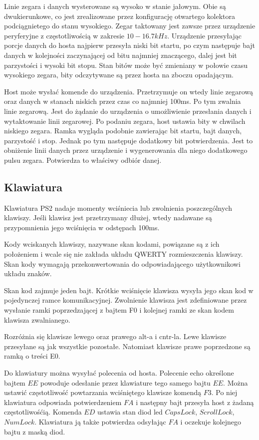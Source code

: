 \documentclass[a4paper,12pt]{article}
\begin{document}
Linie zegara i danych wysterowane są wysoko w stanie jałowym. Obie są dwukierunkowe, co jest zrealizowane przez konfigurację otwartego kolektora podciągnietego do stanu wysokiego. Zegar taktowany jest zawsze przez urządzenie peryferyjne z częstotliwością w zakresie $10 - 16.7 kHz$. Urządzenie przesyłając porcje danych do hosta najpierw przesyła niski bit startu, po czym następuje bajt danych w kolejności zaczynającej od bitu najmniej znaczącego, dalej jest bit parzystości i wysoki bit stopu. Stan bitów może być zmieniany w połowie czasu wysokiego zegara, bity odczytywane są przez hosta na zboczu opadającym.

Host może wysłać komende do urządzenia. Przetrzymuje on wtedy linie zegarową oraz danych w stanach niskich przez czas co najmniej 100ms. Po tym zwalnia linie zegarową. Jest do żądanie do urządzenia o umożliwienie przesłania danych i wytaktowanie linii zegarowej. Po podaniu zegara, host ustawia bity w chwilach niskiego zegara. Ramka wygląda podobnie zawierając bit startu, bajt danych, parzystość i stop. Jednak po tym następuje dodatkowy bit potwierdzenia. Jest to obniżenie linii danych przez urządzenie i wygenerowania dla niego dodatkowego pulsu zegara. Potwierdza to właściwy odbiór danej.

\subsection{Klawiatura}

Klawiatura PS2 nadaje momenty wciśniecia lub zwolnienia poszczególnych klawiszy. Jeśli klawisz jest przetrzymany dłużej, wtedy nadawane są przypomnienia jego wciśnięcia w odstępach 100ms.

Kody wciskanych klawiszy, nazywane skan kodami, powiązane są z ich położeniem i wcale się nie zakłada układu QWERTY rozmieszczenia klawiszy. Skan kody wymagają przekonwertowania do odpowiadającego użytkownikowi układu znaków.

Skan kod zajmuje jeden bajt. Krótkie wciśnięcie klawisza wysyła jego skan kod w pojedynczej ramce komunikacyjnej. Zwolnienie klawisza jest zdefiniowane przez wysłanie ramki poprzedzającej z bajtem F0 i kolejnej ramki ze skan kodem klawisza zwalnianego.

Rozróżnia się klawisze lewego oraz prawego alt-a i cntr-la. Lewe klawisze przesyłane są jak wszystkie pozostałe. Natomiast klawisze prawe poprzedzone są ramką o treści E0.

Do klawiatury można wysyłać polecenia od hosta. Polecenie echo określone bajtem $EE$ powoduje odesłanie przez klawiature tego samego bajtu $EE$. Można ustawić częstotliwość powtarzania wciśniętego klawisze komendą $F3$. Po niej klawiatura odpowiada potwierdzeniem $FA$ i następny bajt przesyła host z żadaną częstotliwośćią. Komenda $ED$ ustawia stan diod led $Caps Lock$, $Scroll Lock$, $Num Lock$. Klawiatura ją także potwierdza odsyłając $FA$ i oczekuje kolejnego bajtu z maską diod.
\end{document}
